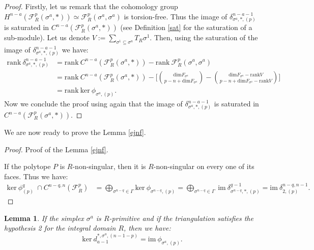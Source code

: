 \documentclass{article}
\newtheorem{lemma}{Lemma}
\begin{document}
\begin{proof}
    Firstly, let us remark that the cohomology group $H^{n-a}(\mathcal{F}^p_R(\sigma^a,*))\simeq \mathcal{F}_R^p(\sigma^a,\sigma^a)$ is torsion-free. Thus the image of $\delta^{n-a-1}_{\sigma^a,*,(p)}$ is saturated in $C^{n-a}(\mathcal{F}^p_R(\sigma^a,*))$ (see Definition \ref{sat} for the saturation of a sub-module). Let us denote $V:=\sum_{\sigma^1 \subseteq \sigma^a}T_R \sigma^1$. Then, using the saturation of the image of $\delta^{n-a-1}_{\sigma^a,*,(p)}$ we have:
    \begin{align*}
        \mathrm{rank} ~ \delta^{n-a-1}_{\sigma^a,*,(p)} &= \mathrm{rank}~ C^{n-a}(\mathcal{F}^p_R(\sigma^a,*))- \mathrm{rank} ~ \mathcal{F}_R^p(\sigma^a,\sigma^a) \\&= \mathrm{rank}~ C^{n-a}(\mathcal{F}^p_R(\sigma^a,*))-\Bigg[ \binom{\mathrm{dim}F_{\sigma^a}}{p-n+\mathrm{dim}F_{\sigma^a}} -\binom{\mathrm{dim}F_{\sigma^a}-\mathrm{rank}V}{p-n+\mathrm{dim}F_{\sigma^a}-\mathrm{rank}V} \Bigg]\\
        &= \mathrm{rank} ~ \mathrm{ker}~ \phi_{\sigma^a,(p)}.
    \end{align*}
    Now we conclude the proof using again that the image of $\delta^{n-a-1}_{\sigma^a,*,(p)}$ is saturated in $C^{n-a}(\mathcal{F}^p_R(\sigma^a,*))$.
\end{proof}

We are now ready to prove the Lemma \ref{ejnf}.

\begin{proof}
    Proof of the Lemma \ref{ejnf}.

    If the polytope $P$ is $R$-non-singular, then it is $R$-non-singular on every one of its faces. Thus we have:
    \begin{align*}
        \mathrm{ker} ~ \phi^q_{(p)} ~ \cap C^{n-q,n}(\mathcal{F}^p_R) &=\bigoplus_{\sigma^{n-q}\in\Gamma}\mathrm{ker}~\phi_{\sigma^{n-q},(p)} = \bigoplus_{\sigma^{n-q}\in\Gamma}~ \mathrm{im} ~\delta^{q-1}_{\sigma^{n-q},*,(p)} = \mathrm{im}~ \delta^{n-q,n-1}_{2,(p)}.
    \end{align*}
\end{proof}

\begin{lemma}
    If the simplex $\sigma^a$ is $R$-primitive and if the triangulation satisfies the hypothesis 2 for the integral domain $R$, then we have:
    \begin{equation*}
        \mathrm{ker}~ d^{*,\sigma^a,(n-1-p)}_{a-1} = \mathrm{im}~\phi_{\sigma^a,(p)}.
    \end{equation*}
\end{lemma}
\end{document}
